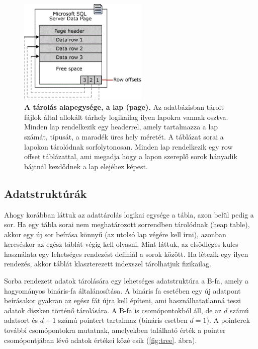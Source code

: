 \documentclass[12pt]{article}
\theoremstyle{plain}
\begin{document}
\begin{figure}[H]
    \begin{center}
    \includegraphics[width=0.55\textwidth]{media/page.png}
    \caption{\textbf{A tárolás alapegysége, a lap (page).} Az adatbázisban tárolt fájlok által allokált tárhely logikailag ilyen lapokra vannak osztva. Minden lap rendelkezik egy headerrel, amely tartalmazza a lap számát, típusát, a maradék üres hely méretét. A táblázat sorai a lapokon tárolódnak sorfolytonosan. Minden lap rendelkezik egy row offset táblázattal, ami megadja hogy a lapon szereplő sorok hányadik bájtnál kezdődnek a lap elejéhez képest.} 
    \label{fig:lap}
    \end{center}
\end{figure}

\subsection{Adatstruktúrák}
Ahogy korábban láttuk az adattárolás logikai egysége a tábla, azon belül pedig a sor. Ha egy tábla sorai nem meghatározott sorrendben tárolódnak (heap table), akkor egy új sor beírása könnyű (az utolsó lap végére kell írni), azonban kereséskor az egész táblát végig kell olvasni. Mint láttuk, az elsődleges kulcs használata egy lehetséges rendezést definiál a sorok között. Ha létezik egy ilyen rendezés, akkor táblát klaszterezett indexszel tárolhatjuk fizikailag.\par
Sorba rendezett adatok tárolására egy lehetséges adatstruktúra a B-fa, amely a hagyományos bináris-fa általánosítása. A bináris fa esetében egy új adatpont beírásakor gyakran az egész fát újra kell építeni, ami használhatatlanná teszi adatok diszken történő tárolására. A B-fa is csomópontokból áll, de az $d$ számú adatsort és $d+1$ számú pointert tartalmaz (bináris esetben $d = 1$). A pointerek további csomópontokra mutatnak, amelyekben található érték a pointer csomópontjában lévő adatok értékei közé esik (\ref{fig:tree}. ábra).
\end{document}
